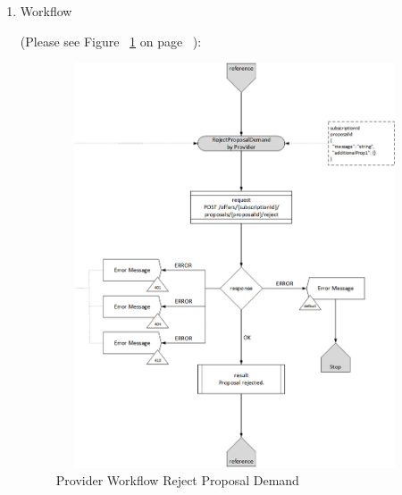 \begin{enumerate}
\item Workflow

(Please see Figure ~\ref{fig:RPD} on page ~\pageref{fig:RPD}):

\begin{figure}[H]
    \centering
    \includegraphics[width=12cm,height=12cm,angle=0]{./diag/Workflow/Market/RejectProposalDemand-P-Workflow.png}
    \caption{Provider Workflow Reject Proposal Demand }
	\label{fig:RPD}
\end{figure}

\end{enumerate}

\newpage



